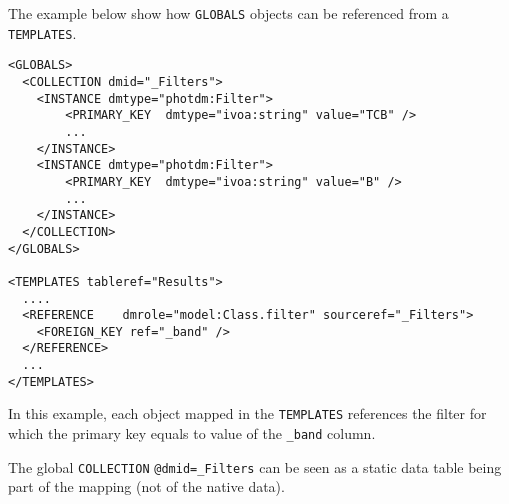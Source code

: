 The example below show how \texttt{GLOBALS} objects can be referenced from a  \texttt{TEMPLATES}. 

\begin{lstlisting}[frame=single,caption={Dynamic reference example},style=XML,basicstyle=\tiny]
<GLOBALS>
  <COLLECTION dmid="_Filters">
    <INSTANCE dmtype="photdm:Filter">
		<PRIMARY_KEY  dmtype="ivoa:string" value="TCB" />
		...
	</INSTANCE>
	<INSTANCE dmtype="photdm:Filter">
		<PRIMARY_KEY  dmtype="ivoa:string" value="B" />
		...
	</INSTANCE>
  </COLLECTION>
</GLOBALS>

<TEMPLATES tableref="Results">
  ....
  <REFERENCE	dmrole="model:Class.filter"	sourceref="_Filters">
    <FOREIGN_KEY ref="_band" />
  </REFERENCE>
  ...
</TEMPLATES>

\end{lstlisting}  

In this example, each object mapped in the \texttt{TEMPLATES} references the filter for which the primary key equals to value of the \texttt{\_band} column.

The global \texttt{COLLECTION} \texttt{@dmid=\_Filters} can be seen as a static data table being part of the mapping (not of the native data).

